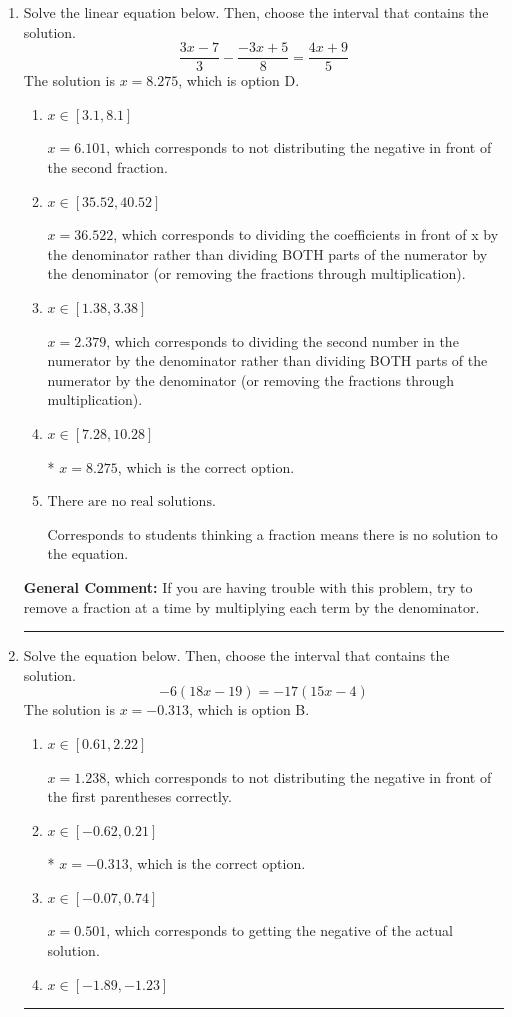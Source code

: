 \documentclass{extbook}[14pt]
\newcommand{\litem}[1]{\item #1

\rule{\textwidth}{0.4pt}}
\begin{document}
\begin{enumerate}\litem{
Solve the linear equation below. Then, choose the interval that contains the solution.
\[ \frac{3x -7}{3} - \frac{-3x + 5}{8} = \frac{4x + 9}{5} \]The solution is \( x = 8.275 \), which is option D.\begin{enumerate}[label=\Alph*.]
\item \( x \in [3.1, 8.1] \)

 $x = 6.101$, which corresponds to not distributing the negative in front of the second fraction.
\item \( x \in [35.52, 40.52] \)

 $x = 36.522$, which corresponds to dividing the coefficients in front of x by the denominator rather than dividing BOTH parts of the numerator by the denominator (or removing the fractions through multiplication).
\item \( x \in [1.38, 3.38] \)

 $x = 2.379$, which corresponds to dividing the second number in the numerator by the denominator rather than dividing BOTH parts of the numerator by the denominator (or removing the fractions through multiplication).
\item \( x \in [7.28, 10.28] \)

* $x = 8.275$, which is the correct option.
\item \( \text{There are no real solutions.} \)

Corresponds to students thinking a fraction means there is no solution to the equation.
\end{enumerate}

\textbf{General Comment:} If you are having trouble with this problem, try to remove a fraction at a time by multiplying each term by the denominator.
}
\litem{
Solve the equation below. Then, choose the interval that contains the solution.
\[ -6(18x -19) = -17(15x -4) \]The solution is \( x = -0.313 \), which is option B.\begin{enumerate}[label=\Alph*.]
\item \( x \in [0.61, 2.22] \)

$x = 1.238$, which corresponds to not distributing the negative in front of the first parentheses correctly.
\item \( x \in [-0.62, 0.21] \)

* $x = -0.313$, which is the correct option.
\item \( x \in [-0.07, 0.74] \)

$x = 0.501$, which corresponds to getting the negative of the actual solution.
\item \( x \in [-1.89, -1.23] \)


\end{enumerate}}
\end{enumerate}
\end{document}
